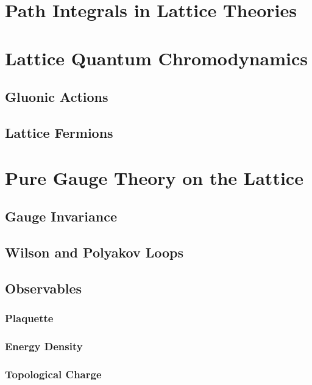 \section{Path Integrals in Lattice Theories}

\section{Lattice Quantum Chromodynamics}
\subsection{Gluonic Actions}
\subsection{Lattice Fermions}

\section{Pure Gauge Theory on the Lattice}
\subsection{Gauge Invariance}
\subsection{Wilson and Polyakov Loops}
\subsection{Observables}
\subsubsection{Plaquette}
\subsubsection{Energy Density}
\subsubsection{Topological Charge}



